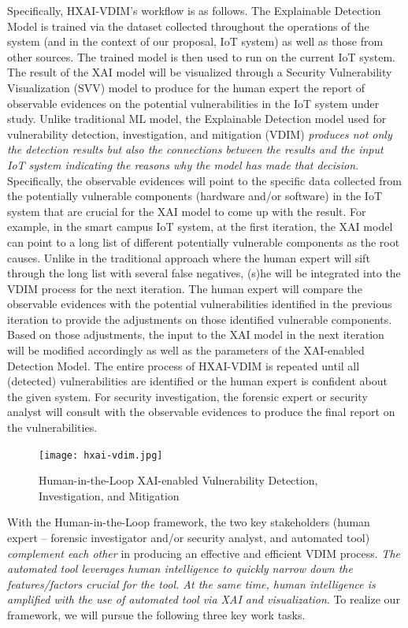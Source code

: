 Specifically, HXAI-VDIM's workflow is as follows. The Explainable Detection Model is trained via the dataset collected throughout the operations of the system (and in the context of our proposal, IoT system) as well as those from other sources. The trained model is then used to run on the current IoT system. The result of the XAI model will be visualized through a Security Vulnerability Visualization (SVV) model to produce for the human expert the report of observable evidences on the potential vulnerabilities in the IoT system under study.  
Unlike traditional ML model, the Explainable Detection model used for vulnerability detection, investigation, and mitigation (VDIM) {\em produces not only the detection results but also the connections between the results and the input IoT system indicating the reasons why the model has made that decision}. Specifically, the observable evidences will point to the specific data collected from the potentially vulnerable components (hardware and/or software) in the IoT system that are crucial for the XAI model to come up with the result. For example, in the smart campus IoT system, at the first iteration, the XAI model can point to a long list of different potentially vulnerable components as the root causes. Unlike in the traditional approach where the human expert will sift through the long list with several false negatives, (s)he will be integrated into the VDIM process for the next iteration. The human expert will compare the observable evidences with the potential vulnerabilities identified in the previous iteration to provide the adjustments on those identified vulnerable components. Based on those adjustments, the input to the XAI model in the next iteration will be modified accordingly as well as the parameters of the XAI-enabled Detection Model. The entire process of HXAI-VDIM is repeated until all (detected) vulnerabilities are identified or the human expert is confident about the given system. For security investigation, the forensic expert or security analyst will consult with the observable evidences to produce the final report on the vulnerabilities.


\begin{figure}[t]
	\centering
	\texttt{[image: hxai-vdim.jpg]}
	\caption{Human-in-the-Loop XAI-enabled Vulnerability Detection, Investigation, and Mitigation}
	\label{fig:overview}
\end{figure}
With the Human-in-the-Loop framework, the two key stakeholders (human expert -- forensic investigator and/or security analyst, and automated tool) {\em complement  each other} in producing an effective and efficient VDIM process. {\em The automated tool leverages human intelligence to quickly narrow down the features/factors crucial for the tool. At the same time, human intelligence is amplified with the use of automated tool via XAI and visualization}. To realize our framework, we will pursue the following three key work tasks.

